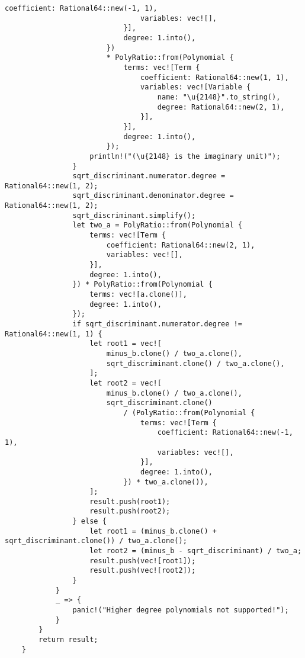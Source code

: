 \begin{lstlisting}[caption={The implementation of the \texttt{roots()} method for the \texttt{Polynomial} struct}, label={lst:polynomial-roots}]
                                coefficient: Rational64::new(-1, 1),
                                variables: vec![],
                            }],
                            degree: 1.into(),
                        })
                        * PolyRatio::from(Polynomial {
                            terms: vec![Term {
                                coefficient: Rational64::new(1, 1),
                                variables: vec![Variable {
                                    name: "\u{2148}".to_string(),
                                    degree: Rational64::new(2, 1),
                                }],
                            }],
                            degree: 1.into(),
                        });
                    println!("(\u{2148} is the imaginary unit)");
                }
                sqrt_discriminant.numerator.degree = Rational64::new(1, 2);
                sqrt_discriminant.denominator.degree = Rational64::new(1, 2);
                sqrt_discriminant.simplify();
                let two_a = PolyRatio::from(Polynomial {
                    terms: vec![Term {
                        coefficient: Rational64::new(2, 1),
                        variables: vec![],
                    }],
                    degree: 1.into(),
                }) * PolyRatio::from(Polynomial {
                    terms: vec![a.clone()],
                    degree: 1.into(),
                });
                if sqrt_discriminant.numerator.degree != Rational64::new(1, 1) {
                    let root1 = vec![
                        minus_b.clone() / two_a.clone(),
                        sqrt_discriminant.clone() / two_a.clone(),
                    ];
                    let root2 = vec![
                        minus_b.clone() / two_a.clone(),
                        sqrt_discriminant.clone()
                            / (PolyRatio::from(Polynomial {
                                terms: vec![Term {
                                    coefficient: Rational64::new(-1, 1),
                                    variables: vec![],
                                }],
                                degree: 1.into(),
                            }) * two_a.clone()),
                    ];
                    result.push(root1);
                    result.push(root2);
                } else {
                    let root1 = (minus_b.clone() + sqrt_discriminant.clone()) / two_a.clone();
                    let root2 = (minus_b - sqrt_discriminant) / two_a;
                    result.push(vec![root1]);
                    result.push(vec![root2]);
                }
            }
            _ => {
                panic!("Higher degree polynomials not supported!");
            }
        }
        return result;
    }
\end{lstlisting}

